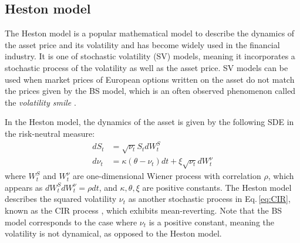 {\subsection{Heston model}\label{sec:Heston}
The Heston model \cite{heston1993closed} is a popular mathematical model to describe the dynamics of the asset price and its volatility and has become widely used in the financial industry.
It is one of stochastic volatility (SV) models, meaning it incorporates a stochastic process of the volatility as well as the asset price.
SV models can be used when market prices of European options written on the asset do not match the prices given by the BS model, which is an often observed phenomenon called the {\it volatility smile} \cite{dupire1994pricing}.

In the Heston model, the dynamics of the asset is given by the following SDE in the risk-neutral measure:
\begin{align}
    dS_t &= \sqrt{\nu_t} S_t dW_t^S  \label{eq:Heston} \\ 
    d \nu_t &= \kappa(\theta -\nu_t) dt + \xi \sqrt{\nu_t} dW_t^\nu \label{eq:CIR}
\end{align}
where $W_t^S$ and $W_t^\nu$ are one-dimensional Wiener process with correlation $\rho$, which appears as $dW_t^S dW_t^\nu = \rho dt$, and $\kappa, \theta, \xi$ are positive constants.
The Heston model describes the squared volatility $\nu_t$ as another stochastic process in Eq.\,\eqref{eq:CIR}, known as the CIR process \cite{cox2005theory}, which exhibits mean-reverting.
Note that the BS model corresponds to the case where $\nu_t$ is a positive constant, meaning the volatility is not dynamical, as opposed to the Heston model.


}
